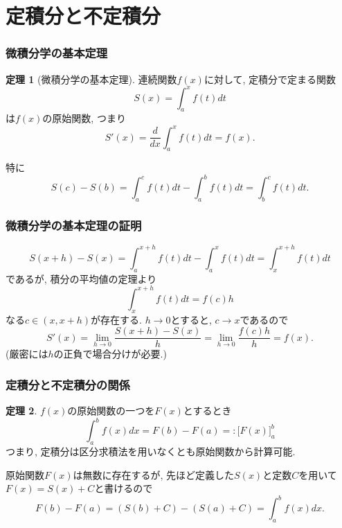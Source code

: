 \documentclass[dvipdfmx,cjk,10.2pt]{beamer}
\theoremstyle{definition}
\newtheorem{Thm}{定理}[section]
\begin{document}
\section{定積分と不定積分}

\begin{frame}
\frametitle{微積分学の基本定理}


\begin{Thm}[微積分学の基本定理]
連続関数$f(x)$に対して, 定積分で定まる関数
$$
S(x)=\int_a^x f(t)dt
$$
は$f(x)$の原始関数, つまり
$$
S'(x)= \frac{d}{dx} \int_a^x f(t)dt = f(x).
$$
\end{Thm}
特に
$$
S(c)-S(b)= \int_a^c f(t)dt-\int_a^b f(t)dt = \int_b^c f(t)dt. 
$$

\end{frame}



\begin{frame}
\frametitle{微積分学の基本定理の証明}


$$
S(x+h)-S(x)=\int_a^{x+h} f(t)dt - \int_a^{x} f(t)dt = \int_x^{x+h} f(t)dt
$$
であるが, 積分の平均値の定理より
$$
\int_x^{x+h} f(t)dt = f(c)h
$$
なる$c \in (x,x+h)$が存在する. 
$h \to 0$とすると, $c \to x$であるので
$$
S'(x)=\lim_{h \to 0} \frac{S(x+h)-S(x)}{h}=\lim_{h \to 0}\frac{f(c)h}{h}=f(x).
$$
(厳密には$h$の正負で場合分けが必要.)

\end{frame}



\begin{frame}
\frametitle{定積分と不定積分の関係}

\begin{Thm}
$f(x)$の原始関数の一つを$F(x)$とするとき
$$
\int_a^b f(x)dx=F(b)-F(a)=:\big[F(x)\big]_a^b
$$
つまり, 定積分は区分求積法を用いなくとも原始関数から計算可能.  
\end{Thm}
原始関数$F(x)$は無数に存在するが, 先ほど定義した$S(x)$と定数$C$を用いて$F(x)=S(x)+C$と書けるので
$$
F(b)-F(a)=(S(b)+C)-(S(a)+C)=\int_a^bf(x)dx. 
$$

\end{frame}


\end{document}
